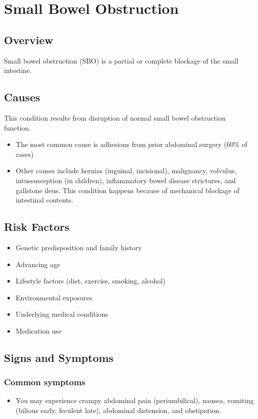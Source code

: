 \chapter{Small Bowel Obstruction}
\label{sec:Small Bowel Obstruction}

\section{Overview}
Small bowel obstruction (SBO) is a partial or complete blockage of the small intestine.
\section{Causes}
This condition results from disruption of normal small bowel obstruction function.

\begin{itemize}[noitemsep]
  \item The most common cause is adhesions from prior abdominal surgery (60\% of cases)
  \item Other causes include hernias (inguinal, incisional), malignancy, volvulus, intussusception (in children), inflammatory bowel disease strictures, and gallstone ileus. This condition happens because of mechanical blockage of intestinal contents.
\end{itemize}
\section{Risk Factors}


\begin{itemize}[noitemsep]
  \item Genetic predisposition and family history
  \item Advancing age
  \item Lifestyle factors (diet, exercise, smoking, alcohol)
  \item Environmental exposures
  \item Underlying medical conditions
  \item Medication use
\end{itemize}
\section{Signs and Symptoms}

\subsection{Common symptoms}
\begin{itemize}[noitemsep]
  \item You may experience crampy abdominal pain (periumbilical), nausea, vomiting (bilious early, feculent late), abdominal distension, and obstipation. 
  \end{itemize}

